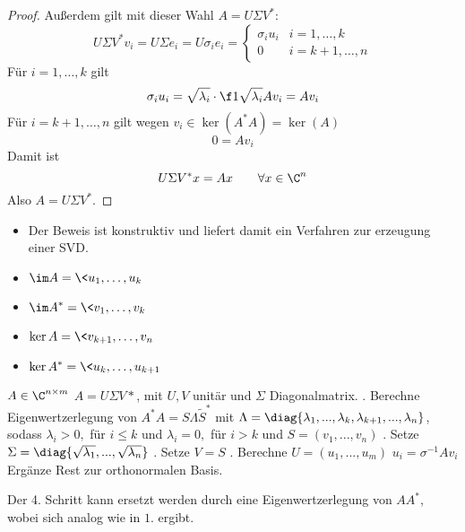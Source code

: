 \documentclass[11pt]{scrartcl}
\begin{document}
\begin{st}
\begin{proof}
		Außerdem gilt mit dieser Wahl $A=U\Sigma V^*$:
		\[
			U\Sigma V^* v_i = U \Sigma e_i = U \sigma_i e_i = \begin{cases}
				\sigma_i u_i & i=1,\dotsc,k \\
				0 & i =k+1,\dotsc,n
			\end{cases}
		\]
		Für $i=1,\dotsc,k$ gilt
		\[
			\sigma_i u_i = \sqrt{\lambda_i} \cdot \f 1{\sqrt{\lambda_i}}Av_i = Av_i
		\]
		Für $i=k+1,\dotsc, n$ gilt wegen $v_i \in \ker (A^*A) = \ker (A)$
		\[
			0 = Av_i
		\]
		Damit ist
		\[
			U\Sigma V^* x = Ax \qquad \forall x\in \C^n
		\]
		Also $A= U\Sigma V^*$.
	\end{proof}
	\begin{note}
		\begin{itemize}
			\item
				Der Beweis ist konstruktiv und liefert damit ein Verfahren zur erzeugung einer SVD.
			\item
				$\displaystyle \im A = \<u_1,\dotsc,u_k\>$
			\item
				$\displaystyle \im A^* = \<v_1,\dotsc, v_k\>$
			\item
				$\displaystyle \ker A = \<v_{k+1},\dotsc, v_n\>$
			\item
				$\displaystyle \ker A^* = \<u_k,\dotsc, u_{k+1}\>$
		\end{itemize}
	\end{note}
\end{st}
\begin{alg*}[SVD]
\begin{algorithmic}
\Assume $ A\in \C^{n\times m} $
\Ensure $ A=U\Sigma V*$, mit $ U,V $  unitär und $\Sigma$ Diagonalmatrix. 
. Berechne Eigenwertzerlegung von $ A^*A=S\Lambda \tilde{S}^* $ mit $ \Lambda=\diag\{\lambda_1,..., \lambda_k, \lambda_{k+1},...,\lambda_{n}\} $, sodass $ \lambda_i>0, $ für $ i\le k $ und $ \lambda_i=0, $ für $ i>k $ und $ S=(v_1,...,v_n) $
. Setze $ \Sigma=\diag{\sqrt{\lambda_1}, ..., \sqrt{\lambda_n}} $
. Setze $ V=S $
. Berechne $ U=(u_1,...,u_m) $
\State $ u_i=\sigma^{-1}Av_i $
\EndFor
\State Ergänze Rest zur orthonormalen Basis.
\end{algorithmic}
\end{alg*}
\begin{note*}
Der 4. Schritt kann ersetzt werden durch eine Eigenwertzerlegung von $ AA^* $, wobei sich analog wie in $ 1. $ ergibt.
\end{note*}
\end{document}
